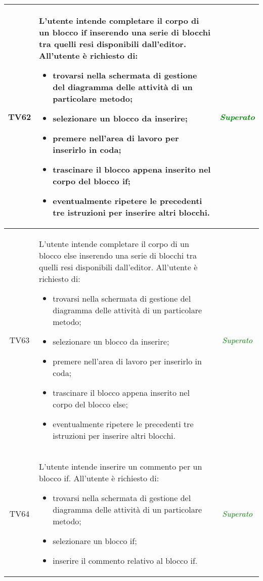 \begin{longtable}{|c|>{}m{8cm}|c|}
\hypertarget{TV4.3.2}{TV62} & L'utente intende completare il corpo di un blocco if inserendo una serie di blocchi tra quelli resi disponibili dall'editor.
All'utente è richiesto di:
\begin{itemize}
	\item trovarsi nella schermata di gestione del diagramma delle attività di un particolare metodo;
	\item selezionare un blocco da inserire;
	\item premere nell'area di lavoro per inserirlo in coda;
	\item trascinare il blocco appena inserito nel corpo del blocco if;
	\item eventualmente ripetere le precedenti tre istruzioni per inserire altri blocchi.
\end{itemize} & \textcolor{Green}{\textit{Superato}}\\ \hline

\hypertarget{TV4.3.3}{TV63} & L'utente intende completare il corpo di un blocco else inserendo una serie di blocchi tra quelli resi disponibili dall'editor.
All'utente è richiesto di:
\begin{itemize}
	\item trovarsi nella schermata di gestione del diagramma delle attività di un particolare metodo;
	\item selezionare un blocco da inserire;
	\item premere nell'area di lavoro per inserirlo in coda;
	\item trascinare il blocco appena inserito nel corpo del blocco else;
	\item eventualmente ripetere le precedenti tre istruzioni per inserire altri blocchi.
\end{itemize} & \textcolor{Green}{\textit{Superato}}\\ \hline

\hypertarget{TV4.3.4}{TV64} & L'utente intende inserire un commento per un blocco if.
All'utente è richiesto di:
\begin{itemize}
	\item trovarsi nella schermata di gestione del diagramma delle attività di un particolare metodo;
	\item selezionare un blocco if;
	\item inserire il commento relativo al blocco if.
\end{itemize} & \textcolor{Green}{\textit{Superato}}\\ \hline


\end{longtable}

